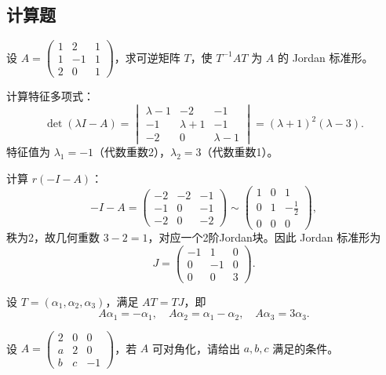 \documentclass[lang=cn,12pt]{elegantbook}
\begin{document}
\subsection{计算题}
\begin{example}
    设 \(A = \begin{pmatrix} 1 & 2 & 1 \\ 1 & -1 & 1 \\ 2 & 0 & 1 \end{pmatrix}\)，求可逆矩阵 \(T\)，使 \(T^{-1} A T\) 为 \(A\) 的 Jordan 标准形。
\end{example}

\begin{solution}
计算特征多项式：
\[
\det(\lambda I - A) = 
\begin{vmatrix}
\lambda-1 & -2 & -1 \\
-1 & \lambda+1 & -1 \\
-2 & 0 & \lambda-1
\end{vmatrix}
= (\lambda+1)^2(\lambda-3).
\]
特征值为 \(\lambda_1 = -1\)（代数重数2），\(\lambda_2 = 3\)（代数重数1）。

计算 \(r(-I - A)\)：
\[
-I - A = \begin{pmatrix}
-2 & -2 & -1 \\
-1 & 0 & -1 \\
-2 & 0 & -2
\end{pmatrix}
\sim \begin{pmatrix}
1 & 0 & 1 \\
0 & 1 & -\frac{1}{2} \\
0 & 0 & 0
\end{pmatrix},
\]
秩为2，故几何重数 \(3 - 2 = 1\)，对应一个2阶Jordan块。因此 Jordan 标准形为
\[
J = \begin{pmatrix}
-1 & 1 & 0 \\
0 & -1 & 0 \\
0 & 0 & 3
\end{pmatrix}.
\]

设 \(T = (\alpha_1, \alpha_2, \alpha_3)\)，满足 \(AT = TJ\)，即
\[
A\alpha_1 = - \alpha_1,\quad A\alpha_2 = \alpha_1 - \alpha_2,\quad A\alpha_3 = 3\alpha_3.
\]
\end{solution}

\begin{example}
    设 \(A = \begin{pmatrix} 2 & 0 & 0 \\ a & 2 & 0 \\ b & c & -1 \end{pmatrix}\)，若 \(A\) 可对角化，请给出 \(a,b,c\) 满足的条件。
\end{example}
    
\end{document}
